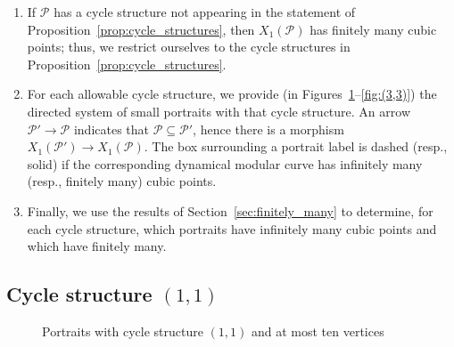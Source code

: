 \documentclass[12pt]{amsart}
\theoremstyle{definition}
\newcommand{\calP}{\mathcal{P}}
\numberwithin{equation}{section}
\begin{document}
\begin{enumerate}[label=(\arabic*)]
    \item If $\calP$ has a cycle structure not appearing in the statement of Proposition~\ref{prop:cycle_structures}, then $X_1(\calP)$ has finitely many cubic points; thus, we restrict ourselves to the cycle structures in Proposition~\ref{prop:cycle_structures}.
    \item For each allowable cycle structure, we provide (in Figures~\ref{fig:(1,1)}--\ref{fig:(3,3)}) the directed system of small portraits with that cycle structure. An arrow $\calP' \to \calP$ indicates that $\calP \subseteq \calP'$, hence there is a morphism $X_1(\calP') \to X_1(\calP)$. The box surrounding a portrait label is dashed (resp., solid) if the corresponding dynamical modular curve has infinitely many (resp., finitely many) cubic points.
    \item Finally, we use the results of Section~\ref{sec:finitely_many} to determine, for each cycle structure, which portraits have infinitely many cubic points and which have finitely many.
\end{enumerate}

\subsection{Cycle structure $(1,1)$}

\begin{figure}
    \caption{Portraits with cycle structure $(1,1)$ and at most ten vertices}
    \label{fig:(1,1)}
\end{figure}
\end{document}
